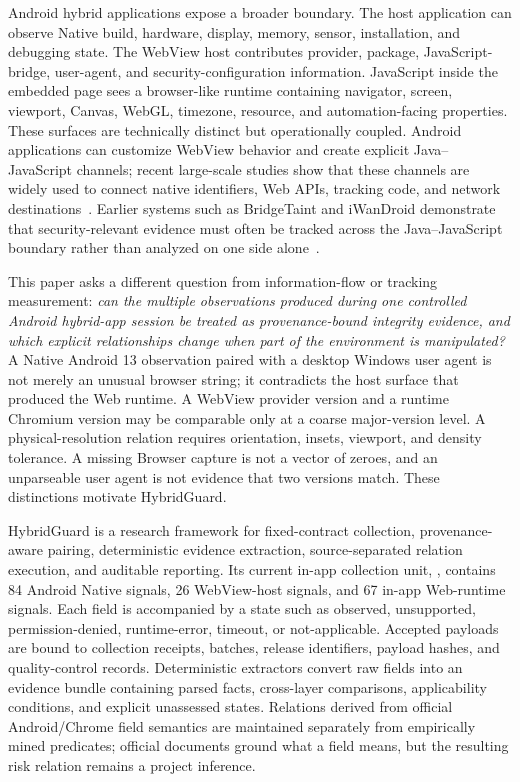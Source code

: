 Android hybrid applications expose a broader boundary. The host application can observe Native build, hardware, display, memory, sensor, installation, and debugging state. The WebView host contributes provider, package, JavaScript-bridge, user-agent, and security-configuration information. JavaScript inside the embedded page sees a browser-like runtime containing navigator, screen, viewport, Canvas, WebGL, timezone, resource, and automation-facing properties. These surfaces are technically distinct but operationally coupled. Android applications can customize WebView behavior and create explicit Java--JavaScript channels; recent large-scale studies show that these channels are widely used to connect native identifiers, Web APIs, tracking code, and network destinations~\cite{weerasekara2025tracking,datta2026crossboundary}. Earlier systems such as BridgeTaint and iWanDroid demonstrate that security-relevant evidence must often be tracked across the Java--JavaScript boundary rather than analyzed on one side alone~\cite{bai2019bridgetaint,tiwari2023demand}.

This paper asks a different question from information-flow or tracking measurement: \emph{can the multiple observations produced during one controlled Android hybrid-app session be treated as provenance-bound integrity evidence, and which explicit relationships change when part of the environment is manipulated?} A Native Android 13 observation paired with a desktop Windows user agent is not merely an unusual browser string; it contradicts the host surface that produced the Web runtime. A WebView provider version and a runtime Chromium version may be comparable only at a coarse major-version level. A physical-resolution relation requires orientation, insets, viewport, and density tolerance. A missing Browser capture is not a vector of zeroes, and an unparseable user agent is not evidence that two versions match. These distinctions motivate HybridGuard.

HybridGuard is a research framework for fixed-contract collection, provenance-aware pairing, deterministic evidence extraction, source-separated relation execution, and auditable reporting. Its current in-app collection unit, \appfp, contains 84 Android Native signals, 26 WebView-host signals, and 67 in-app Web-runtime signals. Each field is accompanied by a state such as observed, unsupported, permission-denied, runtime-error, timeout, or not-applicable. Accepted payloads are bound to collection receipts, batches, release identifiers, payload hashes, and quality-control records. Deterministic extractors convert raw fields into an evidence bundle containing parsed facts, cross-layer comparisons, applicability conditions, and explicit unassessed states. Relations derived from official Android/Chrome field semantics are maintained separately from empirically mined predicates; official documents ground what a field means, but the resulting risk relation remains a project inference.

